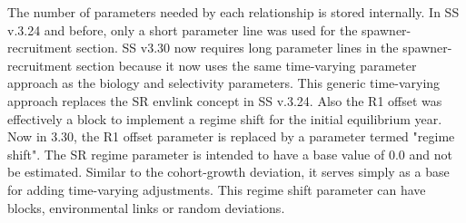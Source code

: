 The number of parameters needed by each relationship is stored internally.  In SS v.3.24 and before, only a short parameter line was used for the spawner-recruitment section. SS v3.30 now requires long parameter lines in the spawner-recruitment section because it now uses the same time-varying parameter approach as the biology and selectivity parameters.  This generic time-varying approach replaces the SR envlink concept in SS v.3.24.  Also the R1 offset was effectively a block to implement a regime shift for the initial equilibrium year.  Now in 3.30, the R1 offset parameter is replaced by a parameter termed "regime shift".  The SR regime parameter is intended to have a base value of 0.0 and not be estimated.  Similar to the cohort-growth deviation, it serves simply as a base for adding time-varying adjustments. This regime shift parameter can have blocks, environmental links or random deviations. 

